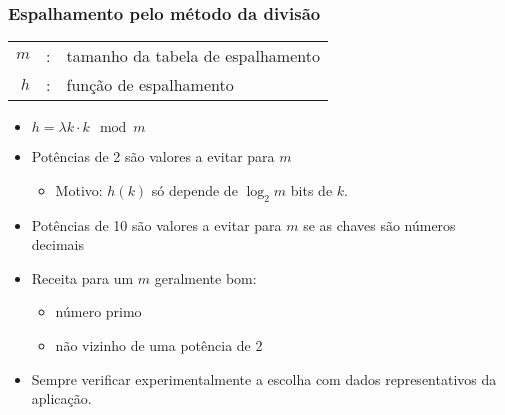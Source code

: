 \documentclass{beamer}
\begin{document}
\begin{frame}

  \frametitle{Espalhamento pelo método da divisão}

  \begin{tabular}{rcl}
    $m$ & : & tamanho da tabela de espalhamento \\
    $h$ & : & função de espalhamento \\
  \end{tabular}
  
  \begin{itemize}
    \item $h = \lambda k \cdot k \mod m$

    \item Potências de 2 são valores a evitar para $m$

      \begin{itemize}

        \item Motivo: $h(k)$ só depende de $\log_2 m$ bits de $k$.

      \end{itemize}

    \item Potências de 10 são valores a evitar para $m$ se as chaves são números decimais

    \item Receita para um $m$ geralmente bom:

      \begin{itemize}

        \item número primo

        \item não vizinho de uma potência de 2

      \end{itemize}

    \item Sempre verificar experimentalmente a escolha com dados representativos da aplicação.
      
\end{itemize}

\end{frame}
\end{document}
